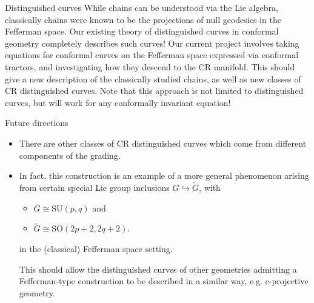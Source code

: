 \documentclass{beamer}
\begin{document}
\begin{frame}{Distinguished curves}
  While chains can be understood via the Lie algebra, classically chains were known to be the projections of null geodesics in the Fefferman space. 
  Our existing theory of distinguished curves in conformal geometry completely describes such curves!
  \vfill
  \pause
  Our current project involves taking equations for conformal curves on the Fefferman space expressed via conformal tractors, and investigating how they descend to the CR manifold.
  \vfill
  This should give a new description of the classically studied chains, as well as new classes of CR distinguished curves.
  \vfill
  \pause
  Note that this approach is not limited to distinguished curves, but will work for any conformally invariant equation!
\end{frame}

\begin{frame}{Future directions}
  \begin{itemize}
    \item There are other classes of CR distinguished curves which come from
      different components of the grading.
    \vfill
      \pause
    \item In fact, this construction is an example of a more general phenomenon arising
  from certain special Lie group inclusions $G \hookrightarrow \tilde{G}$, with
  \begin{itemize}
    \item $G \cong \mathrm{SU}(p,q)$ and 
    \item $\tilde{G} \cong \mathrm{SO}(2p+2, 2q+2)$.
  \end{itemize}
  in the (classical) Fefferman space setting.

  This should allow the distinguished curves of other geometries admitting a
  Fefferman-type construction to be described in a similar way, e.g. c-projective
  geometry.
  \vfill
  \end{itemize}
\end{frame}
\end{document}
